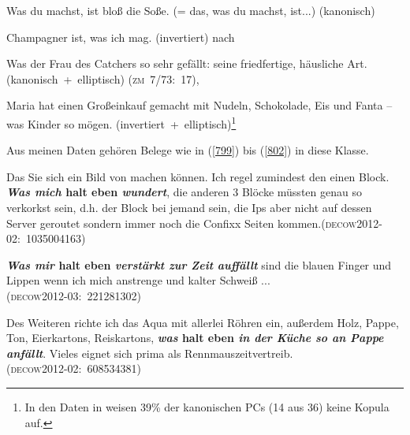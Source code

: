 \begin{exe}
	\ex\label{795} 
	Was du machst, ist bloß die Soße. (= das, was du machst, ist...) (kanonisch)
	\newline
	\hbox{}\hfill\hbox{\citet[360]{Lehmann1984}}	
\end{exe}

\begin{exe}
	\ex\label{796} 
	Champagner ist, was ich mag. (invertiert)
	\hfill\hbox{nach \citet[467]{Lambrecht2001}}	
\end{exe}

\begin{exe}
	\ex\label{797} 
	Was der Frau des Catchers so sehr gefällt: seine friedfertige, häusliche Art. 
	\hbox{}\hfill\hbox{(kanonisch + elliptisch)} \hbox{{\scshape(zm 7/73: 17)}, \citet[74--75]{Dyhr1978}}		
\end{exe}

\begin{exe}
	\ex\label{798} 
	Maria hat einen Großeinkauf gemacht mit Nudeln, Schokolade, Eis und Fanta – was Kinder so mögen.
	\hfill\hbox{(invertiert + elliptisch)}\footnote{In den Daten in \citet[84]{Guenthner2006} weisen 39\% der kanonischen PCs (14 aus 36) keine Kopula auf.}	
\end{exe}			         	                 
Aus meinen Daten gehören Belege wie in (\ref{799}) bis (\ref{802}) in diese Klasse. 

\begin{exe}
	\ex\label{799}
	Das Sie sich ein Bild von machen können. Ich regel zumindest den einen Block. \textbf{\textit{Was mich} halt eben \textit{wundert}}, die anderen 3 Blöcke müssten genau so verkorkst sein, d.h. der Block bei jemand sein, die Ips aber nicht 	auf dessen Server geroutet sondern immer noch die Confixx Seiten kommen.\newline\hbox{}\hfill\hbox{\scshape(decow2012-02: 1035004163)}
\end{exe}

\begin{exe}
	\ex\label{800} 

	\textbf{\textit{Was mir} halt eben \textit{verstärkt zur Zeit auffällt}} sind die blauen Finger und Lippen wenn ich mich anstrenge und kalter Schweiß ...\\\hbox{}\hfill\hbox{\scshape(decow2012-03: 221281302)}
\end{exe}					    	

\begin{exe}
	\ex\label{801} 

	Des Weiteren richte ich das Aqua mit allerlei Röhren ein, außerdem Holz, Pappe, Ton, Eierkartons, Reiskartons, \textbf{\textit{was} halt eben \textit{in der Küche so an Pappe anfällt}}. Vieles eignet sich prima als 						Rennmauszeitvertreib.\\\hbox{}\hfill\hbox{\scshape(decow2012-02: 608534381)}
\end{exe}

